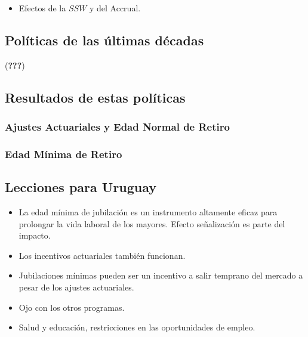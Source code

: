 \documentclass[]{article}
\providecommand{\tightlist}{%
  \setlength{\itemsep}{0pt}\setlength{\parskip}{0pt}}
\begin{document}
\begin{itemize}
\tightlist
\item
  Efectos de la \(SSW\) y del Accrual.
\end{itemize}

\hypertarget{poluxedticas-de-las-uxfaltimas-duxe9cadas}{%
\subsection{Políticas de las últimas
décadas}\label{poluxedticas-de-las-uxfaltimas-duxe9cadas}}

({\textbf{???}})

\hypertarget{resultados-de-estas-poluxedticas}{%
\subsection{Resultados de estas
políticas}\label{resultados-de-estas-poluxedticas}}

\hypertarget{ajustes-actuariales-y-edad-normal-de-retiro}{%
\subsubsection{Ajustes Actuariales y Edad Normal de
Retiro}\label{ajustes-actuariales-y-edad-normal-de-retiro}}

\hypertarget{edad-muxednima-de-retiro-1}{%
\subsubsection{Edad Mínima de Retiro}\label{edad-muxednima-de-retiro-1}}

\hypertarget{lecciones-para-uruguay}{%
\subsection{Lecciones para Uruguay}\label{lecciones-para-uruguay}}

\begin{itemize}
\tightlist
\item
  La edad mínima de jubilación es un instrumento altamente eficaz para
  prolongar la vida laboral de los mayores. Efecto señalización es parte
  del impacto.
\item
  Los incentivos actuariales también funcionan.
\item
  Jubilaciones mínimas pueden ser un incentivo a salir temprano del
  mercado a pesar de los ajustes actuariales.
\item
  Ojo con los otros programas.
\item
  Salud y educación, restricciones en las oportunidades de empleo.
\end{itemize}
\end{document}
